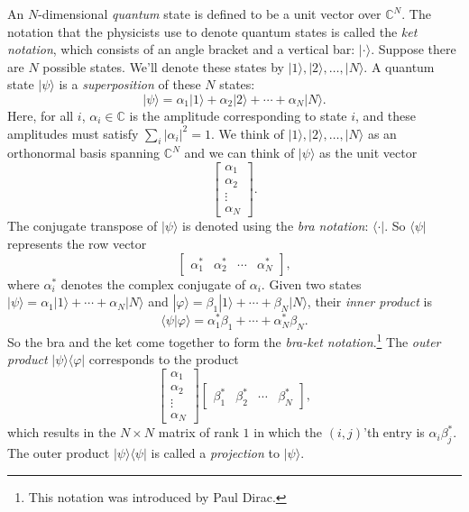 \documentclass[12pt]{report}
\theoremstyle{plain}
\theoremstyle{definition}
\newcommand{\C}{{\mathbb C}}
\renewcommand{\bra}[1]{\langle#1|}
\renewcommand{\ket}[1]{|#1\rangle}
\newcommand{\braket}[2]{\langle#1|#2\rangle}
\newcommand{\ketbra}[2]{|#1\rangle\!\langle#2|}
\begin{document}
An $N$-dimensional \emph{quantum} state is defined to be a unit vector over $\C^N$. The notation that the physicists use to denote quantum states is called the \emph{ket notation}, which consists of an angle bracket and a vertical bar: $\ket{\cdot}$. Suppose there are $N$ possible states. We'll denote these states by $\ket{1}, \ket{2}, \ldots, \ket{N}$. A quantum state $\ket{\psi}$ is a \emph{superposition} of these $N$ states:
\[
\ket{\psi} = \alpha_1 \ket{1} + \alpha_2 \ket{2} + \cdots + \alpha_N \ket{N}.
\]
Here, for all $i$, $\alpha_i \in \C$ is the amplitude corresponding to state $i$, and these amplitudes must satisfy $\sum_i |\alpha_i|^2 = 1$. We think of $\ket{1}, \ket{2}, \ldots, \ket{N}$ as an orthonormal basis spanning $\C^N$ and we can think of $\ket{\psi}$ as the unit vector
\[
\begin{bmatrix}
\alpha_1 \\
\alpha_2 \\
\vdots \\
\alpha_N
\end{bmatrix}.
\]
The conjugate transpose of $\ket{\psi}$ is denoted using the \emph{bra notation}: $\bra{\cdot}$. So $\bra{\psi}$ represents the row vector
\[
\begin{bmatrix}
\alpha_1^* & \alpha_2^* & \cdots & \alpha_N^*
\end{bmatrix},
\]
where $\alpha_i^*$ denotes the complex conjugate of $\alpha_i$. Given two states $\ket{\psi} = \alpha_1 \ket{1} + \cdots + \alpha_N \ket{N}$ and $\ket{\varphi} = \beta_1 \ket{1} + \cdots + \beta_N \ket{N}$, their \emph{inner product} is
\[
\braket{\psi}{\varphi} = \alpha_1^* \beta_1 + \cdots + \alpha_N^* \beta_N.
\]
So the bra and the ket come together to form the \emph{bra-ket notation}.\footnote{This notation was introduced by Paul Dirac.} The \emph{outer product} $\ketbra{\psi}{\varphi}$ corresponds to the product
\[
\begin{bmatrix}
\alpha_1 \\
\alpha_2 \\
\vdots \\
\alpha_N
\end{bmatrix}
\begin{bmatrix}
\beta_1^* & \beta_2^* & \cdots & \beta_N^*
\end{bmatrix},
\]
which results in the $N \times N$ matrix of rank $1$ in which the $(i, j)$'th entry is $\alpha_i \beta_j^*$. The outer product $\ketbra{\psi}{\psi}$ is called a \emph{projection} to $\ket{\psi}$.
\end{document}
